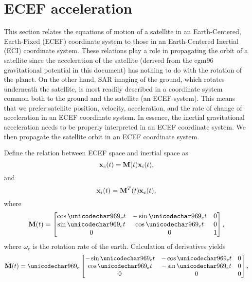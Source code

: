 \section{ECEF acceleration}
\label{an:inertialecef}
This section relates the equations of motion of a satellite in an Earth-Centered, Earth-Fixed (ECEF) coordinate system to those in an Earth-Centered Inertial (ECI) coordinate system. These relations play a role in propagating the orbit of a satellite since the acceleration of the satellite (derived from the egm96 gravitational potential in this document) has nothing to do with the rotation of the planet. On the other hand, SAR imaging of the ground, which rotates underneath the satellite, is most readily described in a coordinate system common both to the ground and the satellite (an ECEF system). This means that we prefer satellite position, velocity, acceleration, and the rate of change of acceleration in an ECEF coordinate system. In essence, the inertial gravitational acceleration needs to be properly interpreted in an ECEF coordinate system. We then propagate the satellite orbit in an ECEF coordinate system.
\par
Define the relation between ECEF space and inertial space as
\begin{equation}
 \vct{x}_e(t)=\mtx{M}(t)\vct{x}_i(t),
\end{equation}
and
\begin{equation}
 \vct{x}_i(t)=\mtx{M}^T(t)\vct{x}_e(t),
\end{equation}
where
\begin{equation}
 \mtx{M}(t)=\begin{bmatrix}
             \ct & -\st & 0\\
             \st & \ct  & 0\\
             0   & 0    & 1
            \end{bmatrix},
\end{equation}
where $\omega_e$ is the rotation rate of the earth.
Calculation of derivatives yields
\begin{equation}
 \dot{\mtx{M}}(t) = \omega_e\begin{bmatrix}
             -\st & -\ct & 0\\
             \ct & -\st  & 0\\
             0   & 0    & 0
            \end{bmatrix},
\end{equation}

